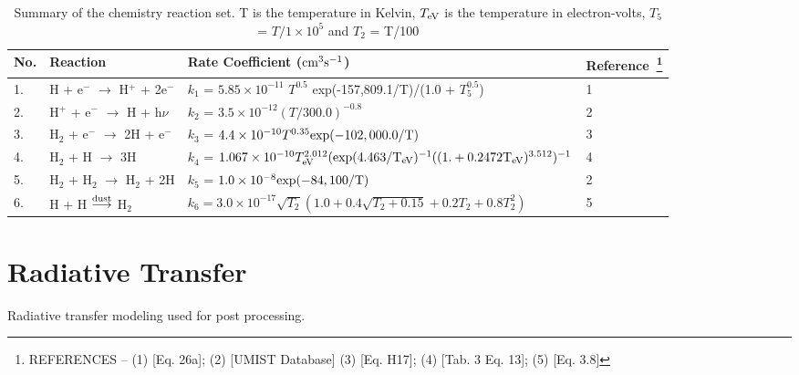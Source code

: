 \documentclass[useAMS,usenatbib,letters]{mn2e}
\begin{document}
\begin{table*}
\begin{minipage}{\textwidth}
\caption{Summary of the chemistry reaction set. T is the temperature
  in Kelvin, $T_{\rm eV}$ is the temperature in electron-volts, $T_{5}$
  = $T/1\times10^{5}$  and 
$T_{2}$  = T/100}
\label{tab:chemeq}
\begin{tabular}{l l l l}
\hline
No. & Reaction & Rate Coefficient ($\rm {cm}^{3} s^{-1}$) &
Reference~\footnote{REFERENCES -- (1) \cite{Cen:1992p13616} [Eq. 26a];
  (2) \cite{Woodall:2007p13623} [UMIST Database] (3)
  \cite{Galli:1998p13066} [Eq. H17]; (4) \cite{Abel:1997p12836}
  [Tab. 3 Eq. 13]; (5) \cite{Hollenbach:1979p12707} [Eq. 3.8]}\\
\hline
1. & H + e$^{-}$ $\rightarrow$ H$^{+}$ + 2e$^{-}$ & $k_1$ = $5.85
\times 10^{-11}$ $T^{0.5}$ \rm{exp}(-157,809.1/T)/(1.0 + $T_{5}^{0.5}$) & 1\\
2. & H$^{+}$ + e$^{-}$ $\rightarrow$ H + h$\nu$ & $k_2$ =
$3.5\times10^{-12} (T/300.0)^{-0.8}$ & 2\\
3. & H$_{2}$ + e$^{-}$ $\rightarrow$ 2H + e$^{-}$ & $k_3$ =
$4.4\times10^{-10} T^{0.35} \rm{exp}(-102,000.0/T)$ & 3\\
4. & H$_{2}$ + H $\rightarrow$ 3H & $k_4$ = $1.067\times10^{-10}
T_{\rm eV}^{2.012}(\rm{exp}(4.463/T_{\rm eV})^{-1}((1. + 0.2472 T_{\rm eV})^{3.512})^{-1} $& 4\\
5. &H$_{2}$ + H$_{2}$ $\rightarrow$ H$_{2}$ + 2H & $k_5$ = $1.0\times 10^{-8} \rm{exp}(-84,100/T)$ & 2\\
6. & H + H $\overset{\rm dust}\longrightarrow$ H$_{2}$ & $k_6 =
3.0\times10^{-17}\sqrt{T_{2}}(1.0 + 0.4\sqrt{T_{2} + 0.15} + 0.2T_{2} + 0.8T_{2}^{2})$ & 5 \\
\hline
\end{tabular}
\end{minipage}
\end{table*}

\section{Radiative Transfer}
Radiative transfer modeling used for post processing.
\end{document}
